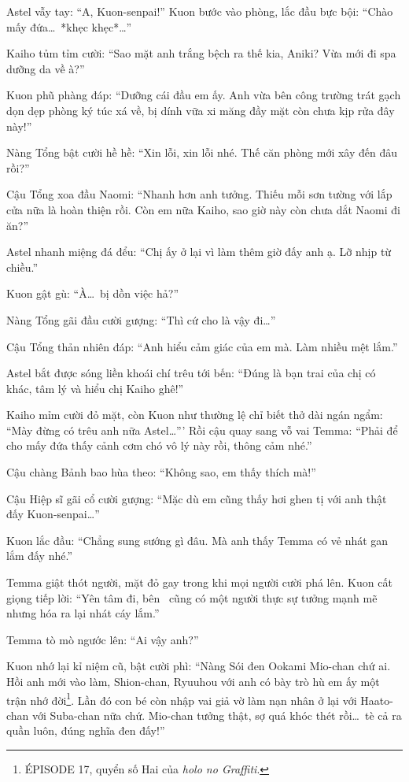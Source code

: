 \documentclass[../main.tex]{subfiles}
\begin{document}
Astel vẫy tay: ``A, Kuon-senpai!'' Kuon bước vào phòng, lắc đầu bực bội: ``Chào mấy đứa\dots\ *khẹc khẹc*\dots''

Kaiho tủm tỉm cười: ``Sao mặt anh trắng bệch ra thế kia, Aniki? Vừa mới đi spa dưỡng da về à?''

Kuon phũ phàng đáp: ``Dưỡng cái đầu em ấy. Anh vừa bên công trường trát gạch dọn dẹp phòng ký túc xá về, bị dính vữa xi măng đầy mặt còn chưa kịp rửa đây này!''

Nàng Tổng bật cười hề hề: ``Xin lỗi, xin lỗi nhé. Thế căn phòng mới xây đến đâu rồi?''

Cậu Tổng xoa đầu Naomi: ``Nhanh hơn anh tưởng. Thiếu mỗi sơn tường với lắp cửa nữa là hoàn thiện rồi. Còn em nữa Kaiho, sao giờ này còn chưa dắt Naomi đi ăn?''

Astel nhanh miệng đá đểu: ``Chị ấy ở lại vì làm thêm giờ đấy anh ạ. Lỡ nhịp từ chiều.''

Kuon gật gù: ``À\dots\ bị dồn việc hả?''

Nàng Tổng gãi đầu cười gượng: ``Thì cứ cho là vậy đi\dots''

Cậu Tổng thản nhiên đáp: ``Anh hiểu cảm giác của em mà. Làm nhiều mệt lắm.''

Astel bắt được sóng liền khoái chí trêu tới bến: ``Đúng là bạn trai của chị có khác, tâm lý và hiểu chị Kaiho ghê!''

Kaiho mỉm cười đỏ mặt, còn Kuon như thường lệ chỉ biết thở dài ngán ngẩm: ``Mày đừng có trêu anh nữa Astel\dots''' Rồi cậu quay sang vỗ vai Temma: ``Phải để cho mấy đứa thấy cảnh cơm chó vô lý này rồi, thông cảm nhé.''

Cậu chàng Bảnh bao hùa theo: ``Không sao, em thấy thích mà!''

Cậu Hiệp sĩ gãi cổ cười gượng: ``Mặc dù em cũng thấy hơi ghen tị với anh thật đấy Kuon-senpai\dots''

Kuon lắc đầu: ``Chẳng sung sướng gì đâu. Mà anh thấy Temma có vẻ nhát gan lắm đấy nhé.''

Temma giật thót người, mặt đỏ gay trong khi mọi người cười phá lên. Kuon cất giọng tiếp lời: ``Yên tâm đi, bên \hll\ cũng có một người thực sự tưởng mạnh mẽ nhưng hóa ra lại nhát cáy lắm.''

Temma tò mò ngước lên: ``Ai vậy anh?''

Kuon nhớ lại kỉ niệm cũ, bật cười phì: ``Nàng Sói đen Ookami Mio-chan chứ ai. Hồi anh mới vào làm, Shion-chan, Ryuuhou với anh có bày trò hù em ấy một trận nhớ đời\footnote{{\flaregothic ÉPISODE 17}, quyển số Hai của \textit{holo no Graffiti}.}. Lần đó con bé còn nhập vai giả vờ làm nạn nhân ở lại với Haato-chan với Suba-chan nữa chứ. Mio-chan tưởng thật, sợ quá khóc thét rồi\dots\ tè cả ra quần luôn, đúng nghĩa đen đấy!''
\end{document}
